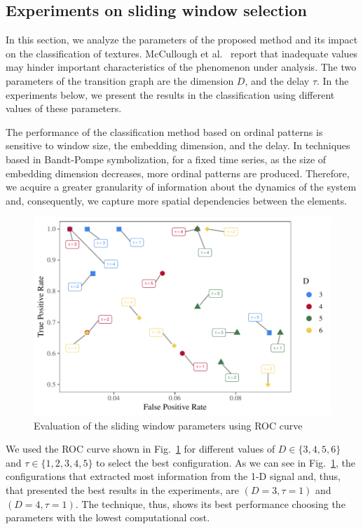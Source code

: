 \documentclass[journal]{IEEEtran}
\begin{document}
\subsection{Experiments on sliding window selection}

In this section, we analyze the parameters of the proposed method and its impact on the classification of textures.
McCullough et al.~\cite{McCullough2015lagged} report that inadequate values may hinder important characteristics of the phenomenon under analysis.
The two parameters of the transition graph are the dimension $D$, and the delay $\tau$.
In the experiments below, we present the results in the classification using different values of these parameters.

The performance of the classification method based on ordinal patterns is sensitive to window size, the embedding dimension, and the delay.
In techniques based in Bandt-Pompe symbolization, for a fixed time series, as the size of embedding dimension decreases, more ordinal patterns are produced.
Therefore, we acquire a greater granularity of information about the dynamics of the system and, consequently, we capture more spatial dependencies between the elements.

\begin{figure}[hbt]
	\includegraphics[width=\columnwidth]{Figures/ROC.pdf}
	\caption{Evaluation of the sliding window parameters using ROC curve}
	\label{fig:ROC}
\end{figure} 

We used the ROC curve shown in Fig.~\ref{fig:ROC} for different values of $D \in \{3, 4, 5, 6 \} $ and $\tau \in \{1, 2, 3, 4, 5 \}$ to select the best configuration.
As we can see in Fig.~\ref{fig:ROC}, the configurations that extracted most information from the 1-D signal and, thus, that presented the best results in the experiments, are $(D = 3, \tau = 1)$ and $(D = 4, \tau = 1)$.
The technique, thus, shows its best performance choosing the parameters with the lowest computational cost.
\end{document}
